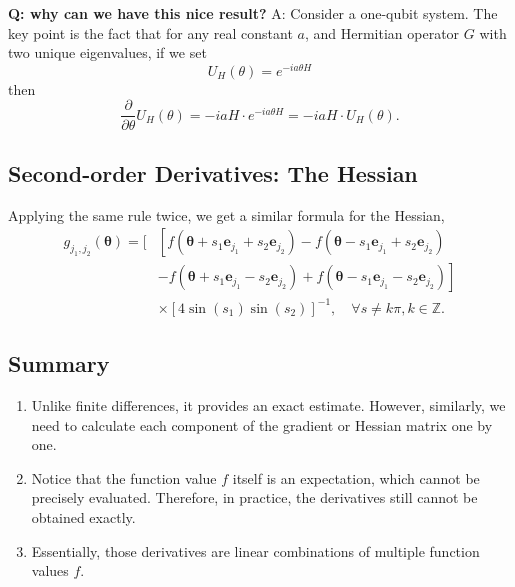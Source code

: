 \documentclass[
        11pt, %
	a4paper, %
]{LegrandOrangeBook}
\begin{document}
\textbf{Q: why can we have this nice result?} 
A: Consider a one-qubit system. The key point is the fact that for any real constant $a$, and Hermitian operator $G$ with two unique eigenvalues, if we set
\begin{equation}
    U_H(\theta)=e^{-i a \theta H}
\end{equation}
then
\begin{equation}
    \frac{\partial}{\partial \theta} U_H(\theta)=-i a H \cdot e^{-i a \theta H} = -i a H \cdot U_H(\theta) .
\end{equation}

\subsection{Second-order Derivatives: The Hessian}
Applying the same rule twice, we get a similar formula for the Hessian,
\begin{equation}
\begin{aligned}
g_{j_1, j_2}(\boldsymbol{\theta})=[ & {\left[f\left(\boldsymbol{\theta}+s_1 \mathbf{e}_{j_1}+s_2 \mathbf{e}_{j_2}\right)-f\left(\boldsymbol{\theta}-s_1 \mathbf{e}_{j_1}+s_2 \mathbf{e}_{j_2}\right)\right.} \\
& \left.-f\left(\boldsymbol{\theta}+s_1 \mathbf{e}_{j_1}-s_2 \mathbf{e}_{j_2}\right)+f\left(\boldsymbol{\theta}-s_1 \mathbf{e}_{j_1}-s_2 \mathbf{e}_{j_2}\right)\right] \\
& \times\left[4 \sin \left(s_1\right) \sin \left(s_2\right)\right]^{-1}, \quad \forall s \neq k \pi, k \in \mathbb{Z}.
\end{aligned}
\end{equation}

\subsection{Summary}

\begin{enumerate}
    \item Unlike finite differences, it provides an exact estimate. However, similarly, we need to calculate each component of the gradient or Hessian matrix one by one.
    \item Notice that the function value $f$ itself is an expectation, which cannot be precisely evaluated. Therefore, in practice, the derivatives still cannot be obtained exactly.
    \item Essentially, those derivatives are linear combinations of multiple function values $f$.
\end{enumerate}
\end{document}
